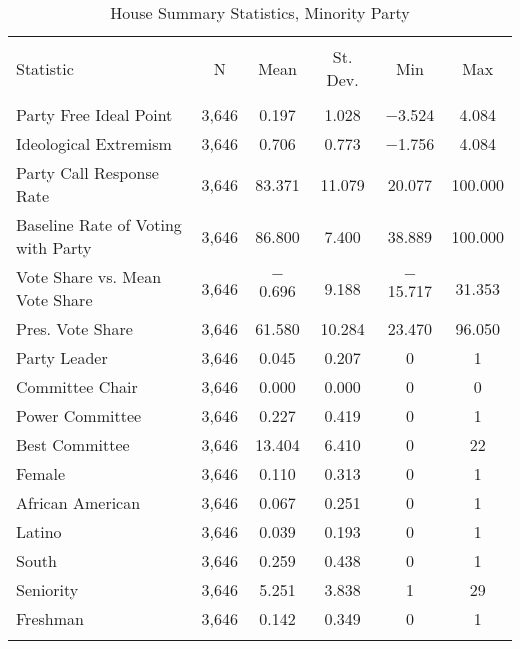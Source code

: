 \documentclass[12pt]{article}
\begin{document}
\begin{table}[H] 
	\centering 
	\singlespacing
	\caption{House Summary Statistics, Minority Party} 
	\label{} 
	\begin{tabular}{@{\extracolsep{5pt}}lccccc} 
		\\[-1.8ex]\hline 
		\hline \\[-1.8ex] 
		Statistic & \multicolumn{1}{c}{N} & \multicolumn{1}{c}{Mean} & \multicolumn{1}{c}{St. Dev.} & \multicolumn{1}{c}{Min} & \multicolumn{1}{c}{Max} \\ 
		\hline \\[-1.8ex] 
		Party Free Ideal Point & 3,646 & 0.197 & 1.028 & $-$3.524 & 4.084 \\ 
		Ideological Extremism & 3,646 & 0.706 & 0.773 & $-$1.756 & 4.084 \\ 
		Party Call Response Rate & 3,646 & 83.371 & 11.079 & 20.077 & 100.000 \\ 
		Baseline Rate of Voting with Party & 3,646 & 86.800 & 7.400 & 38.889 & 100.000 \\ 
		Vote Share vs. Mean Vote Share & 3,646 & $-$0.696 & 9.188 & $-$15.717 & 31.353 \\
		Pres. Vote Share & 3,646 & 61.580 & 10.284 & 23.470 & 96.050 \\ 
		Party Leader & 3,646 & 0.045 & 0.207 & 0 & 1 \\ 
		Committee Chair & 3,646 & 0.000 & 0.000 & 0 & 0 \\ 
		Power Committee & 3,646 & 0.227 & 0.419 & 0 & 1 \\ 
		Best Committee & 3,646 & 13.404 & 6.410 & 0 & 22 \\ 
		Female & 3,646 & 0.110 & 0.313 & 0 & 1 \\ 
		African American & 3,646 & 0.067 & 0.251 & 0 & 1 \\ 
		Latino & 3,646 & 0.039 & 0.193 & 0 & 1 \\ 
		South & 3,646 & 0.259 & 0.438 & 0 & 1 \\		
		Seniority & 3,646 & 5.251 & 3.838 & 1 & 29 \\  
		Freshman & 3,646 & 0.142 & 0.349 & 0 & 1 \\ 		 
		\hline \\[-1.8ex] 
	\end{tabular} 
\end{table} 
\end{document}
